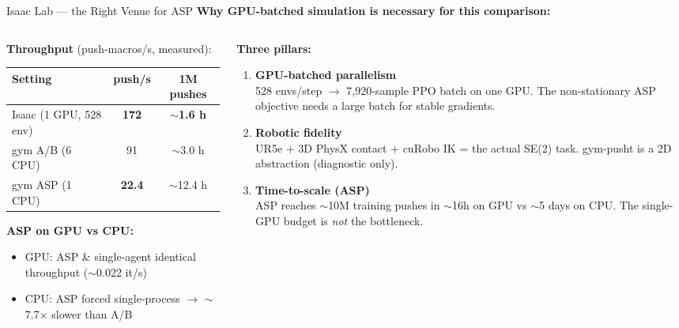 \documentclass[aspectratio=169,xcolor=dvipsnames,t]{beamer}
\begin{document}
\begin{frame}[t]{Isaac Lab — the Right Venue for ASP}
  \textbf{Why GPU-batched simulation is necessary for this comparison:}
  \begin{columns}[T,onlytextwidth]
    \begin{column}{0.50\textwidth}
      \small
      \textbf{Throughput} (push-macros/s, measured):
      \vspace{2pt}
      \begin{tabular}{lcc}
        \toprule
        \textbf{Setting} & \textbf{push/s} & \textbf{1M pushes} \\
        \midrule
        \rowcolor{hlgreen!15}
        Isaac (1 GPU, 528 env) & \textbf{172} & \textbf{$\sim$1.6 h} \\
        gym A/B (6 CPU) & 91 & $\sim$3.0 h \\
        gym ASP (1 CPU) & \textbf{22.4} & $\sim$12.4 h \\
        \bottomrule
      \end{tabular}

      \vspace{4pt}
      \textbf{ASP on GPU vs CPU:}
      \begin{itemize}
        \item GPU: ASP \& single-agent identical throughput ($\sim$0.022 it/s)
        \item CPU: ASP forced single-process $\to$ $\sim$7.7$\times$ slower than A/B
      \end{itemize}
    \end{column}
    \begin{column}{0.48\textwidth}
      \small
      \textbf{Three pillars:}
      \begin{enumerate}
        \item \textbf{GPU-batched parallelism}\\
          528 envs/step $\to$ 7,920-sample PPO batch on one GPU. The non-stationary ASP objective needs a large batch for stable gradients.
        \item \textbf{Robotic fidelity}\\
          UR5e + 3D PhysX contact + cuRobo IK = the actual SE(2) task. gym-pusht is a 2D abstraction (diagnostic only).
        \item \textbf{Time-to-scale (ASP)}\\
          ASP reaches $\sim$10M training pushes in $\sim$16h on GPU vs $\sim$5 days on CPU. The single-GPU budget is \emph{not} the bottleneck.
      \end{enumerate}
    \end{column}
  \end{columns}


\end{frame}
\end{document}

